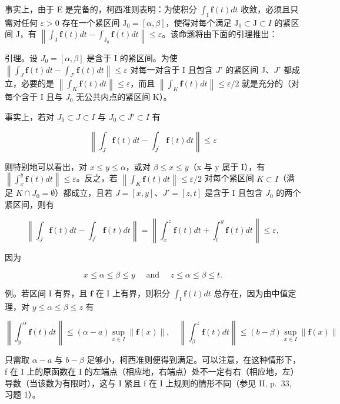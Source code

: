 事实上，由于 E 是完备的，柯西准则表明：为使积分 \(\int_{\mathrm{I}} \mathbf{f}(t) dt\) 收敛，必须且只需对任何 \(\varepsilon > 0\) 存在一个紧区间 \(\mathrm{J}_0 = [\alpha, \beta]\)，使得对每个满足 \(\mathrm{J}_0 \subset \mathrm{J} \subset I\) 的紧区间 J，有 \(\left\| \int_{\mathrm{J}} \mathbf{f}(t) dt - \int_{\mathrm{J}_0} \mathbf{f}(t) dt \right\| \leqslant \varepsilon\)。该命题将由下面的引理推出：

引理。设 \(J_{0} = [\alpha, \beta]\) 是含于 I 的紧区间。为使 \(\left\|\int_{J} \mathbf{f}(t) dt - \int_{J'} \mathbf{f}(t) dt\right\| \leqslant \varepsilon\) 对每一对含于 I 且包含 \(J'\) 的紧区间 J、\(J'\) 都成立，必要的是 \(\left\|\int_{K} \mathbf{f}(t) dt\right\| \leqslant \varepsilon\)，而且 \(\left\|\int_{K} \mathbf{f}(t) dt\right\| \leqslant \varepsilon/2\) 就是充分的（对每个含于 I 且与 \(J_{0}\) 无公共内点的紧区间 K）。

事实上，若对 \(J_{0} \subset J \subset I\) 与 \(J_{0} \subset J' \subset I\) 有

\[
\left\| \int_ {J} \mathbf {f} (t) d t - \int_ {J ^ {\prime}} \mathbf {f} (t) d t \right\| \leqslant \varepsilon
\]

则特别地可以看出，对 \(x \leqslant y \leqslant \alpha\)，或对 \(\beta \leqslant x \leqslant y\)（x 与 y 属于 I），有 \(\left\|\int_{x}^{y} \mathbf{f}(t) dt\right\| \leqslant \varepsilon\)。反之，若 \(\left\|\int_{K} \mathbf{f}(t) dt\right\| \leqslant \varepsilon/2\) 对每个紧区间 \(K \subset I\)（满足 \(K \cap J_{0} = \emptyset\)）都成立，且若 \(J = [x, y]\)、\(J' = [z, t]\) 是含于 I 且包含 \(J_{0}\) 的两个紧区间，则有

\[
\left\| \int_ {J} \mathbf {f} (t) d t - \int_ {J ^ {\prime}} \mathbf {f} (t) d t \right\| = \left\| \int_ {x} ^ {z} \mathbf {f} (t) d t + \int_ {t} ^ {y} \mathbf {f} (t) d t \right\| \leqslant \varepsilon ,
\]

因为

\[
x \leqslant \alpha \leqslant \beta \leqslant y \quad \text { and } \quad z \leqslant \alpha \leqslant \beta \leqslant t.
\]

例。若区间 I 有界，且 \(\mathbf{f}\) 在 I 上有界，则积分 \(\int_{\mathrm{I}}\mathbf{f}(t)dt\) 总存在，因为由中值定理，对 \(y\leqslant \alpha \leqslant \beta \leqslant z\) 有

\[
\left\| \int_ {y} ^ {\alpha} \mathbf {f} (t) d t \right\| \leqslant (\alpha - a) \sup _ {x \in I} \| \mathbf {f} (x) \|, \quad \left\| \int_ {\beta} ^ {z} \mathbf {f} (t) d t \right\| \leqslant (b - \beta) \sup _ {x \in I} \| \mathbf {f} (x) \|
\]

只需取 \(\alpha - a\) 与 \(b - \beta\) 足够小，柯西准则便得到满足。可以注意，在这种情形下，f 在 I 上的原函数在 I 的左端点（相应地，右端点）处不一定有右（相应地，左）导数（当该数为有限时），这与 I 紧且 f 在 I 上规则的情形不同（参见 II, p.~33, 习题 1）。

